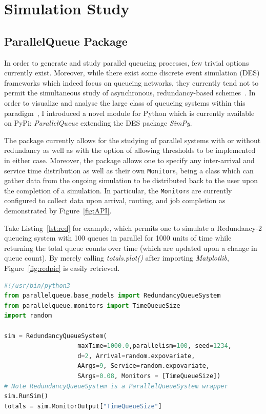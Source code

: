 

\chapter{Simulation Study}\label{ch:simulation-study}


\section{ParallelQueue Package}\label{sec:parallelqueue-package}
In order to generate and study parallel queueing processes, few trivial options currently exist.
Moreover, while there exist some discrete event simulation (DES) frameworks which indeed focus on queueing networks, they currently tend not to permit the simultaneous study of asynchronous, redundancy-based schemes~\cite{noauthor_ciwpythonciw_nodate}.
In order to visualize and analyse the large class of queueing systems within this paradigm~\cite{shneer_large-scale_2020,cruise_stability_2020}, I introduced a novel module for Python which is currently available on PyPi: \textit{ParallelQueue} extending the DES package \textit{SimPy}.

The package currently allows for the studying of parallel systems with or without redundancy as well as with the option of allowing thresholds to be implemented in either case.
Moreover, the package allows one to specify any inter-arrival and service time distribution as well as their own \lstinline{Monitor}s, being a class which can gather data from the ongoing simulation to be distributed back to the user upon the completion of a simulation.
In particular, the \lstinline{Monitor}s are currently configured to collect data upon arrival, routing, and job completion as demonstrated by Figure~\ref{fig:API}.

Take Listing~\ref{lst:red} for example, which permits one to simulate a Redundancy-2 queueing system with 100 queues in parallel for 1000 units of time while returning the total queue counts over time (which are updated upon a change in queue count).
By merely calling \textit{totals.plot()} after importing \textit{Matplotlib}, Figure~\ref{fig:redpic} is easily retrieved.

\begin{lstlisting}[label={lst:red}, caption={Simulation of a redundancy system}, language={Python}, style={mystyle}]
#!/usr/bin/python3
from parallelqueue.base_models import RedundancyQueueSystem
from parallelqueue.monitors import TimeQueueSize
import random

sim = RedundancyQueueSystem(
                    maxTime=1000.0,parallelism=100, seed=1234,
                    d=2, Arrival=random.expovariate,
                    AArgs=9, Service=random.expovariate,
                    SArgs=0.08, Monitors = [TimeQueueSize])
# Note RedundancyQueueSystem is a ParallelQueueSystem wrapper
sim.RunSim()
totals = sim.MonitorOutput["TimeQueueSize"]
\end{lstlisting}

